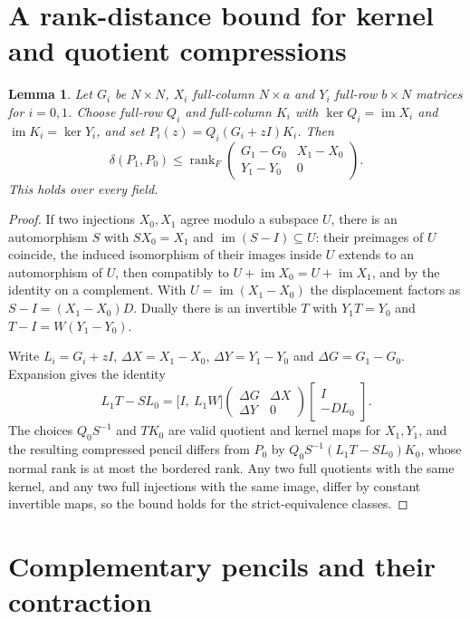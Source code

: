 \documentclass[11pt]{article}
\newtheorem{lemma}{Lemma}
\newcommand{\rk}{\operatorname{rank}}
\newcommand{\im}{\operatorname{im}}
\begin{document}
\section{A rank-distance bound for kernel and quotient compressions}\label{sec:static}

\begin{lemma}\label{lem:static}
Let $G_i$ be $N\times N$, $X_i$ full-column $N\times a$ and $Y_i$ full-row $b\times N$ matrices for $i=0,1$. Choose full-row $Q_i$ and full-column $K_i$ with $\ker Q_i=\im X_i$ and $\im K_i=\ker Y_i$, and set $P_i(z)=Q_i(G_i+zI)K_i$. Then
\begin{equation}\label{eq:static}
\delta(P_1,P_0)\le\rk_F\begin{pmatrix}G_1-G_0&X_1-X_0\\ Y_1-Y_0&0\end{pmatrix}.
\end{equation}
This holds over every field.
\end{lemma}

\begin{proof}
If two injections $X_0,X_1$ agree modulo a subspace $U$, there is an automorphism $S$ with $SX_0=X_1$ and $\im(S-I)\subseteq U$: their preimages of $U$ coincide, the induced isomorphism of their images inside $U$ extends to an automorphism of $U$, then compatibly to $U+\im X_0=U+\im X_1$, and by the identity on a complement. With $U=\im(X_1-X_0)$ the displacement factors as $S-I=(X_1-X_0)D$. Dually there is an invertible $T$ with $Y_1T=Y_0$ and $T-I=W(Y_1-Y_0)$.

Write $L_i=G_i+zI$, $\Delta X=X_1-X_0$, $\Delta Y=Y_1-Y_0$ and $\Delta G=G_1-G_0$. Expansion gives the identity
\[
L_1T-SL_0=\bigl[I,\ L_1W\bigr]\begin{pmatrix}\Delta G&\Delta X\\ \Delta Y&0\end{pmatrix}\begin{bmatrix}I\\ -DL_0\end{bmatrix}.
\]
The choices $Q_0S^{-1}$ and $TK_0$ are valid quotient and kernel maps for $X_1,Y_1$, and the resulting compressed pencil differs from $P_0$ by $Q_0S^{-1}(L_1T-SL_0)K_0$, whose normal rank is at most the bordered rank. Any two full quotients with the same kernel, and any two full injections with the same image, differ by constant invertible maps, so the bound holds for the strict-equivalence classes.
\end{proof}

\section{Complementary pencils and their contraction}\label{sec:complement}
\end{document}
